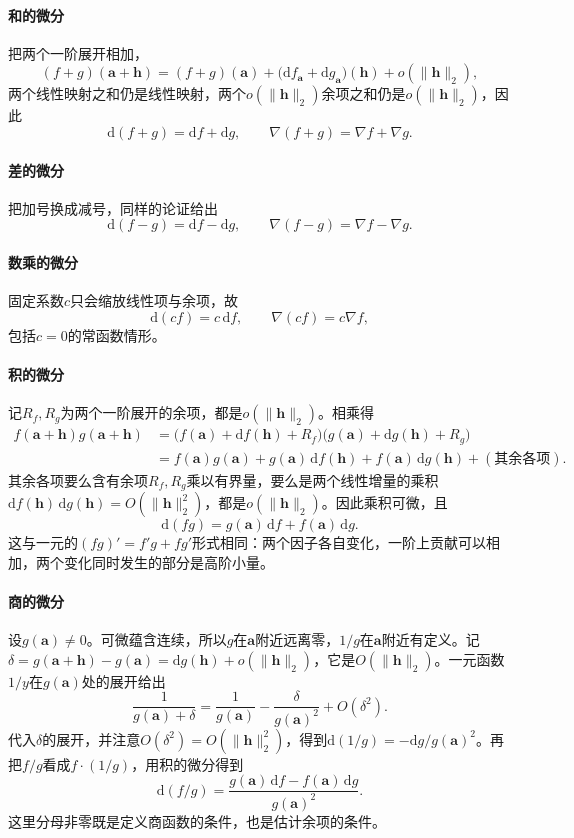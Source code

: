 \paragraph{和的微分}
把两个一阶展开相加，
\[
 (f+g)(\bm a+\bm h)=(f+g)(\bm a)+\bigl(\mathrm df_{\bm a}+\mathrm dg_{\bm a}\bigr)(\bm h)+o(\lVert\bm h\rVert_2),
\]
两个线性映射之和仍是线性映射，两个$o(\lVert\bm h\rVert_2)$余项之和仍是$o(\lVert\bm h\rVert_2)$，因此
\[
 \mathrm d(f+g)=\mathrm df+\mathrm dg,\qquad \nabla(f+g)=\nabla f+\nabla g.
\]

\paragraph{差的微分}
把加号换成减号，同样的论证给出
\[
 \mathrm d(f-g)=\mathrm df-\mathrm dg,\qquad \nabla(f-g)=\nabla f-\nabla g.
\]

\paragraph{数乘的微分}
固定系数$c$只会缩放线性项与余项，故
\[
 \mathrm d(cf)=c\,\mathrm df,\qquad \nabla(cf)=c\nabla f,
\]
包括$c=0$的常函数情形。

\paragraph{积的微分}
记$R_f,R_g$为两个一阶展开的余项，都是$o(\lVert\bm h\rVert_2)$。相乘得
\[
 \begin{aligned}
 f(\bm a+\bm h)g(\bm a+\bm h)
 &=\bigl(f(\bm a)+\mathrm df(\bm h)+R_f\bigr)\bigl(g(\bm a)+\mathrm dg(\bm h)+R_g\bigr)\\
 &=f(\bm a)g(\bm a)+g(\bm a)\,\mathrm df(\bm h)+f(\bm a)\,\mathrm dg(\bm h)+(\text{其余各项}).
 \end{aligned}
\]
其余各项要么含有余项$R_f,R_g$乘以有界量，要么是两个线性增量的乘积$\mathrm df(\bm h)\,\mathrm dg(\bm h)=O(\lVert\bm h\rVert_2^2)$，都是$o(\lVert\bm h\rVert_2)$。因此乘积可微，且
\[
 \mathrm d(fg)=g(\bm a)\,\mathrm df+f(\bm a)\,\mathrm dg.
\]
这与一元的$(fg)'=f'g+fg'$形式相同：两个因子各自变化，一阶上贡献可以相加，两个变化同时发生的部分是高阶小量。

\paragraph{商的微分}
设$g(\bm a)\neq0$。可微蕴含连续，所以$g$在$\bm a$附近远离零，$1/g$在$\bm a$附近有定义。记$\delta=g(\bm a+\bm h)-g(\bm a)=\mathrm dg(\bm h)+o(\lVert\bm h\rVert_2)$，它是$O(\lVert\bm h\rVert_2)$。一元函数$1/y$在$g(\bm a)$处的展开给出
\[
 \frac1{g(\bm a)+\delta}=\frac1{g(\bm a)}-\frac{\delta}{g(\bm a)^2}+O(\delta^2).
\]
代入$\delta$的展开，并注意$O(\delta^2)=O(\lVert\bm h\rVert_2^2)$，得到$\mathrm d(1/g)=-\mathrm dg/g(\bm a)^2$。再把$f/g$看成$f\cdot(1/g)$，用积的微分得到
\[
 \mathrm d(f/g)=\frac{g(\bm a)\,\mathrm df-f(\bm a)\,\mathrm dg}{g(\bm a)^2}.
\]
这里分母非零既是定义商函数的条件，也是估计余项的条件。

